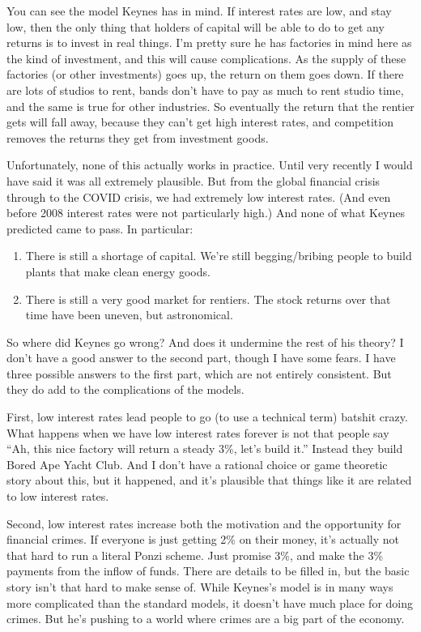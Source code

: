 \documentclass[
  11pt,
  letterpaper,
  DIV=11,
  numbers=noendperiod,
  oneside]{scrartcl}
\providecommand{\tightlist}{%
  \setlength{\itemsep}{0pt}\setlength{\parskip}{0pt}}\usepackage{longtable,booktabs,array}
\begin{document}
You can see the model Keynes has in mind. If interest rates are low, and
stay low, then the only thing that holders of capital will be able to do
to get any returns is to invest in real things. I'm pretty sure he has
factories in mind here as the kind of investment, and this will cause
complications. As the supply of these factories (or other investments)
goes up, the return on them goes down. If there are lots of studios to
rent, bands don't have to pay as much to rent studio time, and the same
is true for other industries. So eventually the return that the rentier
gets will fall away, because they can't get high interest rates, and
competition removes the returns they get from investment goods.

Unfortunately, none of this actually works in practice. Until very
recently I would have said it was all extremely plausible. But from the
global financial crisis through to the COVID crisis, we had extremely
low interest rates. (And even before 2008 interest rates were not
particularly high.) And none of what Keynes predicted came to pass. In
particular:

\begin{enumerate}
\def\labelenumi{\arabic{enumi}.}
\tightlist
\item
  There is still a shortage of capital. We're still begging/bribing
  people to build plants that make clean energy goods.
\item
  There is still a very good market for rentiers. The stock returns over
  that time have been uneven, but astronomical.
\end{enumerate}

So where did Keynes go wrong? And does it undermine the rest of his
theory? I don't have a good answer to the second part, though I have
some fears. I have three possible answers to the first part, which are
not entirely consistent. But they do add to the complications of the
models.

First, low interest rates lead people to go (to use a technical term)
batshit crazy. What happens when we have low interest rates forever is
not that people say ``Ah, this nice factory will return a steady 3\%,
let's build it.'' Instead they build Bored Ape Yacht Club. And I don't
have a rational choice or game theoretic story about this, but it
happened, and it's plausible that things like it are related to low
interest rates.

Second, low interest rates increase both the motivation and the
opportunity for financial crimes. If everyone is just getting 2\% on
their money, it's actually not that hard to run a literal Ponzi
scheme. Just promise 3\%, and make the 3\%
payments from the inflow of funds. There are details to be filled in,
but the basic story isn't that hard to make sense of. While Keynes's
model is in many ways more complicated than the standard models, it
doesn't have much place for doing crimes. But he's pushing to a world
where crimes are a big part of the economy.
\end{document}
